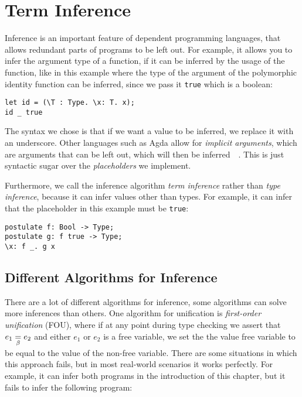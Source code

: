 \chapter{Term Inference}
\label{ch:inference}

Inference is an important feature of dependent programming languages, that allows redundant parts of programs to be left out. For example, it allows you to infer the argument type of a function, if it can be inferred by the usage of the function, like in this example where the type of the argument of the polymorphic identity function can be inferred, since we pass it \verb|true| which is a boolean:
\begin{lstlisting}
let id = (\T : Type. \x: T. x);
id _ true
\end{lstlisting}

The syntax we chose is that if we want a value to be inferred, we replace it with an underscore. Other languages such as Agda allow for \emph{implicit arguments}, which are arguments that can be left out, which will then be inferred~\cite{agda}~\cite{coq}. This is just syntactic sugar over the \emph{placeholders} we implement.

Furthermore, we call the inference algorithm \emph{term inference} rather than \emph{type inference}, because it can infer values other than types. For example, it can infer that the placeholder in this example must be \verb|true|:
\begin{lstlisting}
postulate f: Bool -> Type;
postulate g: f true -> Type;
\x: f _. g x
\end{lstlisting}

\section{Different Algorithms for Inference}
\label{strength-inference}

There are a lot of different algorithms for inference\cite{typeinference}, some algorithms can solve more inferences than others. One algorithm for unification is \emph{first-order unification} (FOU), where if at any point during type checking we assert that $e_1 \underset{\beta}{=} e_2$ and either $e_1$ or $e_2$ is a free variable, we set the the value free variable to be equal to the value of the non-free variable. There are some situations in which this approach fails, but in most real-world scenarios it works perfectly. For example, it can infer both programs in the introduction of this chapter, but it fails to infer the following program:

